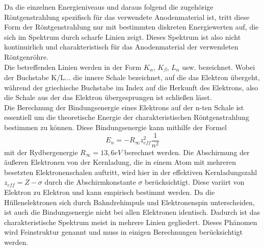 Da die einzelnen Energieniveaus und daraus folgend die zugehörige Röntgenstrahlung spezifisch für das verwendete Anodenmaterial ist, tritt diese Form der Röntgenstrahlung nur mit bestimmten diskreten Energiewerten auf, die sich im Spektrum durch scharfe Linien zeigt. Dieses Spektrum ist also nicht kontinuirlich und charakteristisch für das Anodenmaterial der verwendeten Röntgenröhre. \\
Die betreffenden Linien werden in der Form $K_\alpha$, $K_\beta$, $L_\alpha$ usw. bezeichnet. Wobei der Buchstabe K/L... die innere Schale bezeichnet, auf die das Elektron übergeht, während der griechische Buchstabe im Index auf die Herkunft des Elektrons, also die Schale aus der das Elektron übergesprungen ist schließen lässt. \\
Die Berechnung der Bindungsenergie eines Elektrons auf der n-ten Schale ist essentiell um die theoretische Energie der charakteristischen Röntgenstrahlung bestimmen zu können. Diese Bindungsenergie kann mithilfe der Formel
\begin{equation}
E_n=-R_{\infty}z_{eff}^2\frac{1}{n^2}
\end{equation}
mit der Rydbergenergie $R_{\infty}=13,6 eV$ berechnet werden. Die Abschirmung der äußeren Elektronen von der Kernladung, die in einem Atom mit mehreren besetzten Elektronenschalen auftritt, wird hier in der effektiven Kernladungszahl $z_{eff}=Z-\sigma$ durch die Abschirmkonstante $\sigma$ berücksichtigt. Diese variirt von Elektron zu Elektron und kann empirisch bestimmt werden.
Da die Hüllenelektronen sich durch Bahndrehimpuls und Elektronenspin unterscheiden, ist auch die Bindungsenergie nicht bei allen Elektronen identisch. Dadurch ist das charakteristische Spektrum meist in mehrere Linien gegliedert. Dieses Phänomen wird Feinstruktur genannt und muss in einigen Berechnungen berücksichtigt werden.
